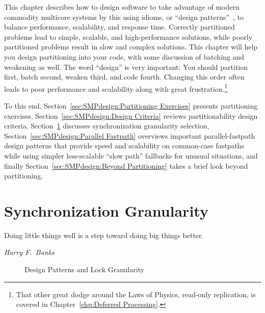 
%

This chapter describes how to design software to take advantage of
modern commodity multicore systems by this using idioms, or
``design patterns''~\cite{Alexander79,GOF95,SchmidtStalRohnertBuschmann2000v2Textbook},
to balance performance, scalability, and response time.
Correctly partitioned problems lead to simple, scalable, and
high-performance solutions, while poorly partitioned problems result
in slow and complex solutions.
This chapter will help you design partitioning into your code, with
some discussion of batching and weakening as well.
The word ``design'' is very important: You should partition first,
batch second, weaken third, and code fourth.
Changing this order often leads to poor performance and scalability
along with great frustration.\footnote{
	That other great dodge around the Laws of Physics, read-only
	replication, is covered in Chapter~\ref{chp:Deferred Processing}.}

To this end, Section~\ref{sec:SMPdesign:Partitioning Exercises}
presents partitioning exercises,
Section~\ref{sec:SMPdesign:Design Criteria} reviews partitionability
design criteria,
Section~\ref{sec:SMPdesign:Synchronization Granularity}
discusses synchronization granularity selection,
Section~\ref{sec:SMPdesign:Parallel Fastpath}
overviews important parallel-fastpath design patterns
that provide speed and scalability on common-case fastpaths while using
simpler less-scalable ``slow path'' fallbacks for unusual situations,
and finally
Section~\ref{sec:SMPdesign:Beyond Partitioning}
takes a brief look beyond partitioning.





\section{Synchronization Granularity}
\label{sec:SMPdesign:Synchronization Granularity}
%
\epigraph{Doing little things well is a step toward doing big things better.}
	 {\emph{Harry F.~Banks}}

\begin{figure}[tb]
\centering
{}
\caption{Design Patterns and Lock Granularity}
\label{fig:SMPdesign:Design Patterns and Lock Granularity}
\end{figure}

